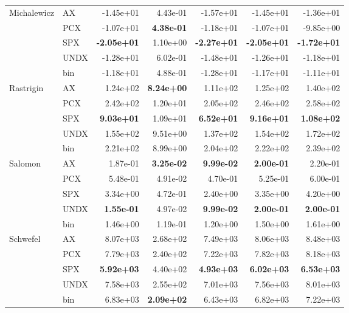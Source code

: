 \begin{tabular}{llrrrrr}
\addlinespace
\addlinespace
Michalewicz & AX & -1.45e+01 & 4.43e-01 & -1.57e+01 & -1.45e+01 & -1.36e+01 \\
\addlinespace
 & PCX & -1.07e+01 & \textbf{4.38e-01} & -1.18e+01 & -1.07e+01 & -9.85e+00 \\
& SPX & \textbf{-2.05e+01} & 1.10e+00 & \textbf{-2.27e+01} & \textbf{-2.05e+01} & \textbf{-1.72e+01} \\
& UNDX & -1.28e+01 & 6.02e-01 & -1.48e+01 & -1.26e+01 & -1.18e+01 \\
& bin & -1.18e+01 & 4.88e-01 & -1.28e+01 & -1.17e+01 & -1.11e+01 \\
\addlinespace
\addlinespace
Rastrigin & AX & 1.24e+02 & \textbf{8.24e+00} & 1.11e+02 & 1.25e+02 & 1.40e+02 \\
\addlinespace
 & PCX & 2.42e+02 & 1.20e+01 & 2.05e+02 & 2.46e+02 & 2.58e+02 \\
& SPX & \textbf{9.03e+01} & 1.09e+01 & \textbf{6.52e+01} & \textbf{9.16e+01} & \textbf{1.08e+02} \\
& UNDX & 1.55e+02 & 9.51e+00 & 1.37e+02 & 1.54e+02 & 1.72e+02 \\
& bin & 2.21e+02 & 8.99e+00 & 2.04e+02 & 2.22e+02 & 2.39e+02 \\
\addlinespace
\addlinespace
Salomon & AX & 1.87e-01 & \textbf{3.25e-02} & \textbf{9.99e-02} & \textbf{2.00e-01} & 2.20e-01 \\
\addlinespace
 & PCX & 5.48e-01 & 4.91e-02 & 4.70e-01 & 5.25e-01 & 6.00e-01 \\
& SPX & 3.34e+00 & 4.72e-01 & 2.40e+00 & 3.35e+00 & 4.20e+00 \\
& UNDX & \textbf{1.55e-01} & 4.97e-02 & \textbf{9.99e-02} & \textbf{2.00e-01} & \textbf{2.00e-01} \\
& bin & 1.46e+00 & 1.19e-01 & 1.20e+00 & 1.50e+00 & 1.61e+00 \\
\addlinespace
\addlinespace
Schwefel & AX & 8.07e+03 & 2.68e+02 & 7.49e+03 & 8.06e+03 & 8.48e+03 \\
\addlinespace
 & PCX & 7.79e+03 & 2.40e+02 & 7.22e+03 & 7.82e+03 & 8.18e+03 \\
& SPX & \textbf{5.92e+03} & 4.40e+02 & \textbf{4.93e+03} & \textbf{6.02e+03} & \textbf{6.53e+03} \\
& UNDX & 7.58e+03 & 2.55e+02 & 7.01e+03 & 7.56e+03 & 8.01e+03 \\
& bin & 6.83e+03 & \textbf{2.09e+02} & 6.43e+03 & 6.82e+03 & 7.22e+03 \\
\bottomrule
\end{tabular}
